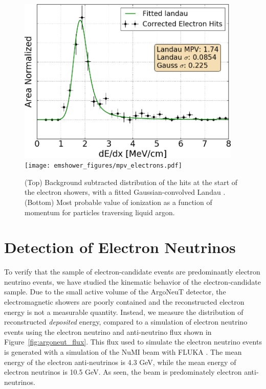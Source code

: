 \begin{figure}[htb]
  \centering
  \includegraphics[width=0.95\textwidth]{emshower_figures/fitted_electron_landau_trimmed.png}
  \texttt{[image: emshower\_figures/mpv\_electrons.pdf]}
  \caption{(Top) Background subtracted distribution of the hits at the start of the electron showers, with a fitted Gaussian-convolved Landau .  (Bottom) Most probable value of ionization as a function of momentum for particles traversing liquid argon.}
  \label{fig:mpv_electrons}
 \end{figure} 

\FloatBarrier

\section{\label{sec:electrons} Detection of Electron Neutrinos}

To verify that the sample of electron-candidate events are predominantly electron neutrino events, we have studied the kinematic behavior of the electron-candidate sample.  Due to the small active volume of the ArgoNeuT detector, the electromagnetic showers are poorly contained and the reconstructed electron energy is not a measurable quantity.  Instead, we measure the distribution of reconstructed {\em deposited} energy, compared to a simulation of electron neutrino events using the electron neutrino and anti-neutrino flux shown in Figure~\ref{fig:argoneut_flux}.  This flux used to simulate the electron neutrino events is generated with a simulation of the NuMI beam with FLUKA \cite{Aliaga:2016oaz}.  The mean energy of the electron anti-neutrinos is 4.3 GeV, while the mean energy of electron neutrinos is 10.5 GeV.  As seen, the beam is predominately electron anti-neutrinos.

